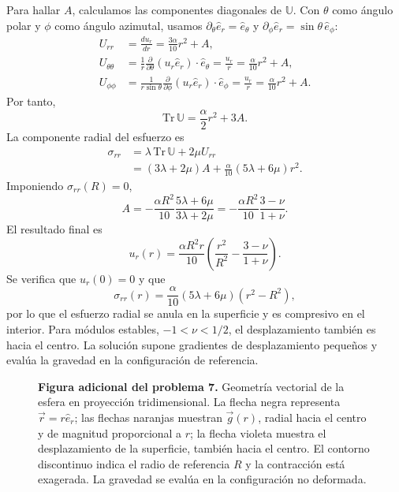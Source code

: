 \documentclass[a4paper]{article}
\begin{document}
Para hallar $A$, calculamos las componentes diagonales de $\mathbb U$. Con $\theta$ como ángulo polar y $\phi$ como ángulo azimutal, usamos $\partial_\theta\hat e_r=\hat e_\theta$ y $\partial_\phi\hat e_r=\sin\theta\,\hat e_\phi$:
\[
\begin{aligned}
U_{rr}
&=\frac{du_r}{dr}=\frac{3\alpha}{10}r^2+A,\\
U_{\theta\theta}
&=\frac{1}{r}\frac{\partial}{\partial\theta}(u_r\hat e_r)\cdot\hat e_\theta
=\frac{u_r}{r}=\frac{\alpha}{10}r^2+A,\\
U_{\phi\phi}
&=\frac{1}{r\sin\theta}\frac{\partial}{\partial\phi}(u_r\hat e_r)\cdot\hat e_\phi
=\frac{u_r}{r}=\frac{\alpha}{10}r^2+A.
\end{aligned}
\]
Por tanto,
\[
\mathrm{Tr}\,\mathbb U=\frac{\alpha}{2}r^2+3A.
\]
La componente radial del esfuerzo es
\[
\begin{aligned}
\sigma_{rr}
&=\lambda\,\mathrm{Tr}\,\mathbb U+2\mu U_{rr}\\
&=(3\lambda+2\mu)A+\frac{\alpha}{10}(5\lambda+6\mu)r^2.
\end{aligned}
\]
Imponiendo $\sigma_{rr}(R)=0$,
\[
A=-\frac{\alpha R^2}{10}\frac{5\lambda+6\mu}{3\lambda+2\mu}
=-\frac{\alpha R^2}{10}\frac{3-\nu}{1+\nu}.
\]
El resultado final es
\[
\boxed{u_r(r)=\frac{\alpha R^2r}{10}
\left(\frac{r^2}{R^2}-\frac{3-\nu}{1+\nu}\right)}.
\]
Se verifica que $u_r(0)=0$ y que
\[
\sigma_{rr}(r)=\frac{\alpha}{10}(5\lambda+6\mu)(r^2-R^2),
\]
por lo que el esfuerzo radial se anula en la superficie y es compresivo en el interior. Para módulos estables, $-1<\nu<1/2$, el desplazamiento también es hacia el centro. La solución supone gradientes de desplazamiento pequeños y evalúa la gravedad en la configuración de referencia.

\begin{figure}[H]
\centering
\resizebox{\textwidth}{!}{}
\par\medskip
\begin{minipage}{\textwidth}
\textbf{Figura adicional del problema 7.} Geometría vectorial de la esfera en proyección tridimensional. La flecha negra representa $\vec r=r\hat e_r$; las flechas naranjas muestran $\vec g(r)$, radial hacia el centro y de magnitud proporcional a $r$; la flecha violeta muestra el desplazamiento de la superficie, también hacia el centro. El contorno discontinuo indica el radio de referencia $R$ y la contracción está exagerada. La gravedad se evalúa en la configuración no deformada.
\end{minipage}
\end{figure}
\end{document}
